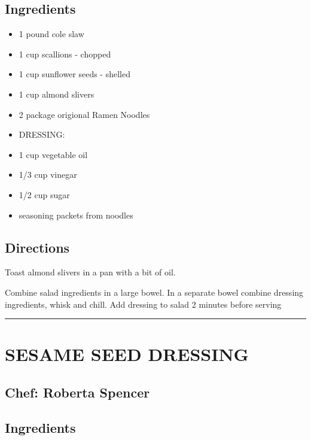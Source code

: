 \documentclass[
]{book}
\providecommand{\tightlist}{%
  \setlength{\itemsep}{0pt}\setlength{\parskip}{0pt}}
\begin{document}
\hypertarget{ingredients-22}{%
\subsection*{Ingredients}\label{ingredients-22}}


\begin{itemize}
\tightlist
\item
  1 pound cole slaw
\item
  1 cup scallions - chopped
\item
  1 cup sunflower seeds - shelled
\item
  1 cup almond slivers
\item
  2 package origional Ramen Noodles
\item
  DRESSING:
\item
  1 cup vegetable oil
\item
  1/3 cup vinegar
\item
  1/2 cup sugar
\item
  seasoning packets from noodles
\end{itemize}

\hypertarget{directions-22}{%
\subsection*{Directions}\label{directions-22}}


Toast almond slivers in a pan with a bit of oil.

Combine salad ingredients in a large bowel. In a separate bowel combine dressing ingredients, whisk and chill. Add dressing to salad 2 minutes before serving

\begin{center}\rule{0.5\linewidth}{0.5pt}\end{center}

\hypertarget{sesame-seed-dressing}{%
\section*{SESAME SEED DRESSING}\label{sesame-seed-dressing}}


\hypertarget{chef-roberta-spencer-4}{%
\subsection*{Chef: Roberta Spencer}\label{chef-roberta-spencer-4}}


\hypertarget{ingredients-23}{%
\subsection*{Ingredients}\label{ingredients-23}}
\end{document}
